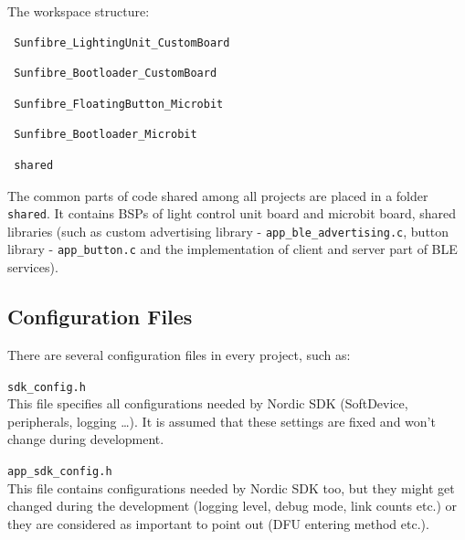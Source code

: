     \begin{titleitemize}{The workspace structure:}
        \item \begin{verbatim} Sunfibre_LightingUnit_CustomBoard \end{verbatim}
        \item \begin{verbatim} Sunfibre_Bootloader_CustomBoard \end{verbatim}
        \item \begin{verbatim} Sunfibre_FloatingButton_Microbit \end{verbatim}
        \item \begin{verbatim} Sunfibre_Bootloader_Microbit\end{verbatim}
        \item \begin{verbatim} shared\end{verbatim}
    \end{titleitemize}
    
    The common parts of code shared among all projects are placed in a folder \verb|shared|. It contains BSPs of light control unit board and microbit board, shared libraries (such as custom advertising library - \verb|app_ble_advertising.c|, button library - \verb|app_button.c| and the implementation of client and server part of BLE services).
    
    
    \subsection{Configuration Files}
        \label{sec:configuration_files}
        There are several configuration files in every project, such as: 
        
        \verb|sdk_config.h|\\
            This file specifies all configurations needed by Nordic SDK (SoftDevice, peripherals, logging \ldots). It is assumed that these settings are fixed and won't change during development.
            
        \verb|app_sdk_config.h|\\
            This file contains configurations needed by Nordic SDK too, but they might get changed during the development (logging level, debug mode, link counts etc.) or they are considered as important to point out (DFU entering method etc.).
            
